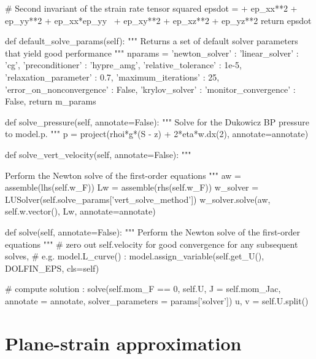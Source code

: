\begin{python}[label=cslvr_first_order, caption={\CSLVR source code contained in the \texttt{MomentumDukowiczBP} class.}]
  # Second invariant of the strain rate tensor squared
  epsdot = + ep_xx**2 + ep_yy**2 + ep_xx*ep_yy \
           + ep_xy**2 + ep_xz**2 + ep_yz**2
  return epsdot

def default_solve_params(self):
  """ 
  Returns a set of default solver parameters that yield good performance
  """
  nparams = {'newton_solver' :
            {
              'linear_solver'            : 'cg',
              'preconditioner'           : 'hypre_amg',
              'relative_tolerance'       : 1e-5,
              'relaxation_parameter'     : 0.7,
              'maximum_iterations'       : 25,
              'error_on_nonconvergence'  : False,
              'krylov_solver'            :
              {
                'monitor_convergence'   : False,
              }
            }}
  return m_params

def solve_pressure(self, annotate=False):
  """
  Solve for the Dukowicz BP pressure to model.p.
  """
  p   = project(rhoi*g*(S - z) + 2*eta*w.dx(2),
                annotate=annotate)


def solve_vert_velocity(self, annotate=False):
  """

  Perform the Newton solve of the first-order equations 
  """
  aw       = assemble(lhs(self.w_F))
  Lw       = assemble(rhs(self.w_F))
  w_solver = LUSolver(self.solve_params['vert_solve_method'])
  w_solver.solve(aw, self.w.vector(), Lw, annotate=annotate)
  
def solve(self, annotate=False):
  """ 
  Perform the Newton solve of the first-order equations 
  """
  # zero out self.velocity for good convergence for any subsequent solves,
  # e.g. model.L_curve() :
  model.assign_variable(self.get_U(), DOLFIN_EPS, cls=self)
  
  # compute solution :
  solve(self.mom_F == 0, self.U, J = self.mom_Jac,
        annotate = annotate, solver_parameters = params['solver'])
  u, v = self.U.split()
\end{python}

\section{Plane-strain approximation} \label{ssn_plane_strain}

